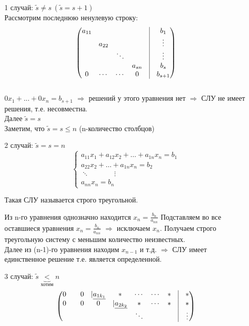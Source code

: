 \documentclass[a4paper, 12pt]{article}
\theoremstyle{definition}
\begin{document}
  \begin{itemize}
    \item[1 случай:]
    $\widetilde{s} \neq s \ (\widetilde{s}=s+1)$ \\ 
    Рассмотрим последнюю ненулевую строку:
    $$\begin{pmatrix}
      a_{11} & \null & \null & \null & \vline & b_1 \\
      \null & a_{22} & \null & \null & \vline & \vdots \\
      \null & \null & \ddots & \null & \vline & \vdots \\
      \null & \null & \null & a_{sn} & \vline & b_s \\
      0 & \cdots & \cdots & 0 & \vline & b_{s+1}
    \end{pmatrix}$$ \\
    $0x_1+...+0x_n=b_{s+1}$ 
    $\Longrightarrow$ решений у этого уравнения нет 
    $\Longrightarrow$ СЛУ не имеет решения, т.е. несовместна. \\
    Далее $\widetilde{s}=s$\\
    Заметим, что $\widetilde{s}=s\leq n$ (n-количество столбцов)
    \item[2 случай:] $\widetilde{s}=s=n$  
    $$\left\{ \begin{aligned}
      a_{11} x_1 + a_{12} x_2+ \dots + a_{1n} x_n = b_1 \\
      a_{22} x_2 + \dots + a_{1n} x_n = b_2 \\ 
      \ddots \ \ \ \ \ \ \ \ \ \ \ \ \ \ \ \ \vdots \ \\
      a_{nn} x_n = b_n
    \end{aligned}
    \right.$$

    Такая СЛУ называется строго треугольной.

    Из n-го уравнения однозначно находится $x_n = \frac{b_n}{a_{nn}}$
    Подставляем во все оставшиеся уравнения $x_n = \frac{b_n}{a_{nn}}$ $\Longrightarrow$ исключаем $x_n$. Получаем строго треугольную систему с меньшим количество неизвестных.  \\
    Далее из (n-1)-го уравнения  находим $x_{n-1}$ и т.д. $\Longrightarrow$ СЛУ имеет единственное решение т.е. является определенной.

    \item[3 случай:] $\widetilde{s}\underbrace{<}_{\text{хотим}} n$ 
  $$\begin{pmatrix}
    0 & \null & 0 & |\underline{a_{1k_1}} & \ast & \cdots & \cdots & \ast & \vline & \ast  \\
    0 & \null & 0 & 0 & |\underline{a_{2k_2}} & \ast & \cdots & \ast & \vline & \ast \\
    \null & \null & \null & \null & \null & \ddots & \null & \null & \vline & \vdots
  \end{pmatrix}$$ 


\end{itemize}
\end{document}
